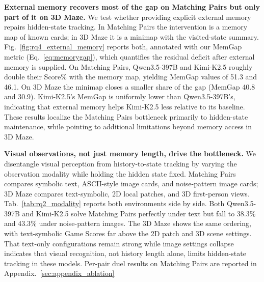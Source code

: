 \noindent\textbf{External memory recovers most of the gap on Matching Pairs but only part of it on 3D Maze.}
We test whether providing explicit external memory repairs hidden-state tracking. In Matching Pairs the intervention is a memory map of known cards; in 3D Maze it is a minimap with the visited-state summary. Fig.~\ref{fig:rq4_external_memory} reports both, annotated with our MemGap metric (Eq.~\ref{eq:memorygap}), which quantifies the residual deficit after external memory is supplied. On Matching Pairs, Qwen3.5-397B and Kimi-K2.5 roughly double their Score\% with the memory map, yielding MemGap values of 51.3 and 46.1. On 3D Maze the minimap closes a smaller share of the gap (MemGap 40.8 and 30.9). Kimi-K2.5's MemGap is uniformly lower than Qwen3.5-397B's, indicating that external memory helps Kimi-K2.5 less relative to its baseline. These results localize the Matching Pairs bottleneck primarily to hidden-state maintenance, while pointing to additional limitations beyond memory access in 3D Maze.


\noindent\textbf{Visual observations, not just memory length, drive the bottleneck.}
We disentangle visual perception from history-to-state tracking by varying the observation modality while holding the hidden state fixed. Matching Pairs compares symbolic text, ASCII-style image cards, and noise-pattern image cards; 3D Maze compares text-symbolic, 2D local patches, and 3D first-person views. Tab.~\ref{tab:rq2_modality} reports both environments side by side. Both Qwen3.5-397B and Kimi-K2.5 solve Matching Pairs perfectly under text but fall to 38.3\% and 43.3\% under noise-pattern images. The 3D Maze shows the same ordering, with text-symbolic Game Scores far above the 2D patch and 3D scene settings. That text-only configurations remain strong while image settings collapse indicates that visual recognition, not history length alone, limits hidden-state tracking in these models. Per-pair duel results on Matching Pairs are reported in Appendix.~\ref{sec:appendix_ablation}


